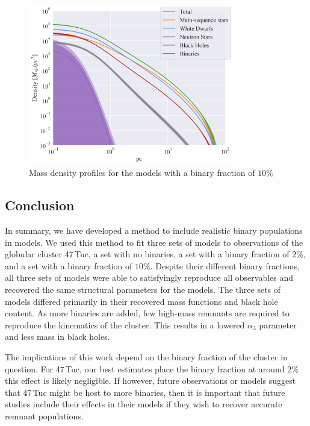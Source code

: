 \begin{figure}
	\centering
	\includegraphics[width=0.8\textwidth]{figures/high_bin_model/density.png}
	\caption{Mass density profiles for the models with a binary fraction of $10\%$}
	\label{fig:highbin_model_densities}
\end{figure}



\subsection{Conclusion}


In summary, we have developed a method to include realistic binary populations in 
models. We used this method to fit three sets of models to observations of the globular cluster
47\,Tuc, a set with no binaries, a set with a binary fraction of $2\%$, and a set with a binary
fraction of $10\%$. Despite their different binary fractions, all three sets of models were able to
satisfyingly reproduce all observables and recovered the same structural parameters for the models.
The three sets of models differed primarily in their recovered mass functions and black hole
content. As more binaries are added, few high-mass remnants are required to reproduce the kinematics
of the cluster. This results in a lowered $\alpha_3$ parameter and less mass in black holes.

The implications of this work depend on the binary fraction of the cluster in question. For 47\,Tuc,
our best estimates place the binary fraction at around $2\%$ this effect is likely negligible. If
however, future observations or models suggest that 47\,Tuc might be host to more binaries, then it
is important that future studies include their effects in their models if they wish to recover
accurate remnant populations.


